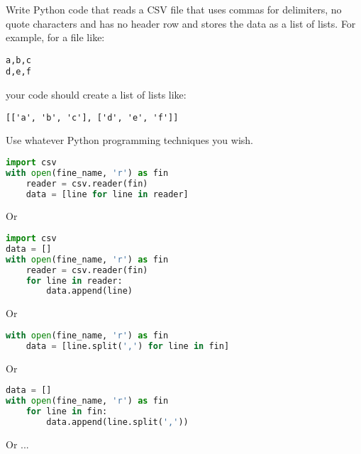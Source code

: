 \documentclass[addpoints,9pt]{exam}
\begin{document}
\begin{questions}


\question[10] Write Python code that reads a CSV file that uses commas for delimiters, no quote characters and has no header row and stores the data as a list of lists.  For example, for a file like:\\

\begin{verbatim}
a,b,c
d,e,f
\end{verbatim}

your code should create a list of lists like:

\begin{verbatim}
[['a', 'b', 'c'], ['d', 'e', 'f']]
\end{verbatim}

Use whatever Python programming techniques you wish.

\ifprintanswers
\begin{lstlisting}[language=Python]
import csv
with open(fine_name, 'r') as fin
    reader = csv.reader(fin)
    data = [line for line in reader]
\end{lstlisting}
Or
\begin{lstlisting}[language=Python]
import csv
data = []
with open(fine_name, 'r') as fin
    reader = csv.reader(fin)
    for line in reader:
        data.append(line)
\end{lstlisting}
Or
\begin{lstlisting}[language=Python]
with open(fine_name, 'r') as fin
    data = [line.split(',') for line in fin]
\end{lstlisting}
Or
\begin{lstlisting}[language=Python]
data = []
with open(fine_name, 'r') as fin
    for line in fin:
        data.append(line.split(','))
\end{lstlisting}
Or ...
\fi



\newpage






\end{questions}
\end{document}
